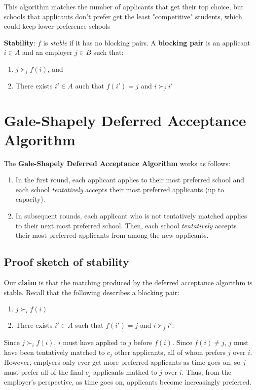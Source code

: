 \documentclass[titlepage, 12pt, leqno]{article}
\begin{document}
This algorithm matches the number of applicants that get their top choice, but 
schools that applicants don't prefer get the least "competitive" students, which
could keep lower-preference schools

\begin{definition}
    \textbf{Stability}: $f$ is \textit{stable} if it has no blocking pairs. A
    \textbf{blocking pair} is an applicant $i \in A$ and an employer $j \in B$
    such that:
    \begin{enumerate}
        \item $j \succ_i f(i)$, and
        \item There exists $i' \in A$ auch that $f(i')=j$ and $i\succ_ji'$
    \end{enumerate}
\end{definition}

\pagebreak
\section{Gale-Shapely Deferred Acceptance Algorithm}
The \textbf{Gale-Shapely Deferred Acceptance Algorithm} works as follows:
\begin{enumerate}
    \item In the first round, each applicant applies to their most preferred
        school and each school \textit{tentatively} accepts their most
        preferred applicants (up to capacity).
    \item In subsequent rounds, each applicant who is not tentatively matched
        applies to their next most preferred school. Then, each school 
        \textit{tentatively} accepts their most preferred applicants from
        among the new applicants.
\end{enumerate}

\subsection{Proof sketch of stability}
Our \textbf{claim }is that the matching produced by the deferred acceptance
algorithm is stable. Recall that the following describes a blocking pair:
\begin{enumerate}
    \item $j \succ_i f(i)$
    \item There exists $i'\in A$ such that $f(i') = j$ and $i \succ_j i'$.
\end{enumerate}
Since $j \succ_i f(i)$, $i$ must have applied to $j$ before $f(i)$. Since 
$f(i) \ne j$, $j$ must have been tentatively matched to $c_j$ other applicants,
all of whom prefers $j$ over $i$. However, emplyers only ever get more
preferred applicants as time goes on, so $j$ must prefer all of the final $c_j$
applicants mathed to $j$ over $i$. Thus, from the employer's perspective, as time
goes on, applicants become increasingly preferred.
\end{document}

